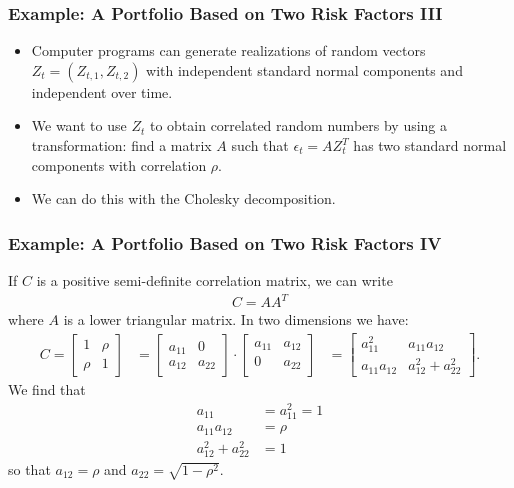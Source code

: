 \begin{frame}[fragile]
\frametitle{Example: A Portfolio Based on Two Risk Factors III}
\begin{itemize}
  \item Computer programs can generate realizations of random vectors
	$Z_t=(Z_{t,1},Z_{t,2})$ with independent standard normal components and
	independent over time.
  \item We want to use $Z_t$ to obtain correlated random numbers by using a
	transformation: find a matrix $A$ such that $\epsilon_t=AZ^T_t$ has two
	standard normal components with correlation $\rho$.
  \item We can do this with the Cholesky decomposition.
\end{itemize}




\end{frame}

\begin{frame}[fragile]
\frametitle{Example: A Portfolio Based on Two Risk Factors IV}
If $C$ is a positive semi-definite correlation matrix, we can write
		\begin{align*}
		  C = AA^T
		\end{align*}
where $A$ is a lower triangular matrix. In two dimensions we have:
\begin{align*}
  C = \left[\begin{array}{cc} 1& \rho \\
  	\rho &1 \end{array}\right] &= \left[\begin{array}{cc} a_{11}& 0 \\
  	a_{12} &a_{22} \end{array}\right] \cdot \left[\begin{array}{cc} a_{11}&
  	a_{12} \\ 0 &a_{22} \end{array}\right]
   &= \left[\begin{array}{cc} a^2_{11}&
   a_{11}a_{12} \\ a_{11}a_{12} &a^2_{12}+a^2_{22} \end{array}\right].
\end{align*}
We find that
\begin{align*}
  a_{11} &= a^2_{11} = 1 \\
  a_{11} a_{12} &= \rho \\
  a^2_{12}+a^2_{22} &= 1
\end{align*}
so that $a_{12}=\rho$ and $a_{22}=\sqrt{1-\rho^2}$.
\end{frame}

